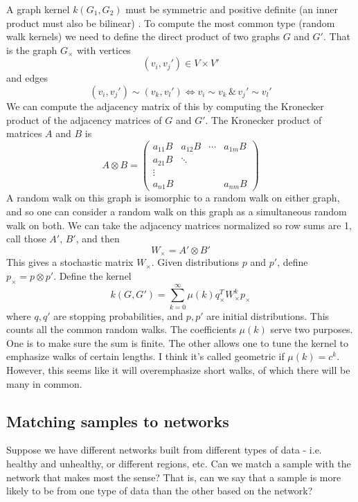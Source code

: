 \documentclass[10pt]{article}
\theoremstyle{definition}
\numberwithin{theorem}{section}
\numberwithin{definition}{section}
\numberwithin{lemma}{section}
\numberwithin{corollary}{section}
\numberwithin{clm}{section}
\numberwithin{rmk}{section}
\begin{document}
A graph kernel $k(G_1,G_2)$ must be symmetric and positive definite (an inner product must also be bilinear) \cite{Vishwanathan}. To compute the most common type (random walk kernels) we need to define the direct product of two graphs $G$ and $G'$. That is the graph $G_{\times}$ with vertices 
\[
(v_i,v_j') \in V \times V'
\]
and edges
\[
(v_i,v_j') \sim (v_k,v_l') \Leftrightarrow v_i \sim v_k \, \&\, v_j' \sim v_l'
\]
We can compute the adjacency matrix of this by computing the Kronecker product of the adjacency matrices of $G$ and $G'$. The Kronecker product of matrices $A$ and $B$ is
\[
A \otimes B = \begin{pmatrix}
a_{11} B & a_{12}B & \cdots & a_{1m}B\\
a_{21}B & \ddots & &\\
\vdots & & & \\
a_{n1}B & & & a_{nm}B
\end{pmatrix}
\]
A random walk on this graph is isomorphic to a random walk on either graph, and so one can consider a random walk on this graph as a simultaneous random walk on both. We can take the adjacency matrices normalized so row sums are 1, call those $A'$, $B'$, and then
\[
W_{\times}  = A' \otimes B'
\] 
This gives a stochastic matrix $W_{\times}$. Given distributions $p$ and $p'$, define $p_{\times}  = p \otimes p'$. Define the kernel
\[
k(G,G') = \sum_{k=0}^{\infty} \mu(k) q_{\times}^T W_{\times}^k p_{\times}
\]
where $q,q'$ are stopping probabilities, and $p,p'$ are initial distributions. This counts all the common random walks. The coefficients $\mu(k)$ serve two purposes. One is to make sure the sum is finite. The other allows one to tune the kernel to emphasize walks of certain lengths. I think it's called geometric if $\mu(k) = c^k$. However, this seems like it will overemphasize short walks, of which there will be many in common.


\subsection{Matching samples to networks}

Suppose we have different networks built from different types of data - i.e. healthy and unhealthy, or different regions, etc. Can we match a sample with the network that makes most the sense? That is, can we say that a sample is more likely to be from one type of data than the other based on the network? 
\end{document}
